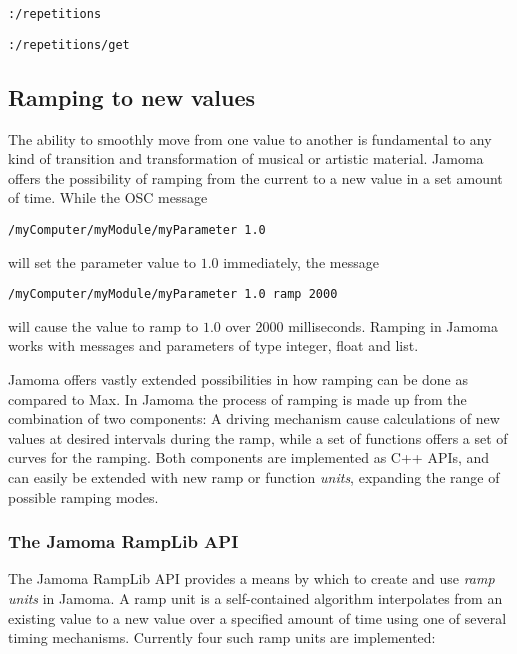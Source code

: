 \documentclass{NIME-alternate}
\begin{document}
\texttt{:/repetitions}

\texttt{:/repetitions/get}





\subsection{Ramping to new values} %
\label{sub:ramping_to_new_values}

The ability to smoothly move from one value to another is fundamental to any kind of transition and transformation of musical or artistic material. Jamoma offers the possibility of ramping from the current to a new value in a set amount of time. While the OSC message

\texttt{/myComputer/myModule/myParameter 1.0}

will set the parameter value to $1.0$ immediately, the message

\texttt{/myComputer/myModule/myParameter 1.0 ramp 2000}

will cause the value to ramp to $1.0$ over 2000 milliseconds. Ramping in Jamoma works with messages and parameters of type integer, float and list.

Jamoma offers vastly extended possibilities in how ramping can be done as compared to Max. In Jamoma the process of ramping is made up from the combination of two components: A driving mechanism cause calculations of new values at desired intervals during the ramp, while a set of functions offers a set of curves for the ramping. Both components are implemented as C++ APIs, and can easily be extended with new ramp or function \emph{units}, expanding the range of possible ramping modes.



\subsubsection{The Jamoma RampLib API} %
\label{ssub:the_ramp_lib}

The Jamoma RampLib API provides a means by which to create and use \emph{ramp units} in Jamoma.  A ramp unit is a self-contained algorithm interpolates from an existing value to a new value over a specified amount of time using one of several timing mechanisms. Currently four such ramp units are implemented:
\end{document}
